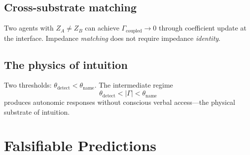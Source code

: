 \documentclass[aps,pre,twocolumn,superscriptaddress,floatfix]{revtex4-2}
\begin{document}
\subsection{Cross-substrate matching}
\label{sec:cross-substrate}

\begin{corollary}
\label{cor:cross-substrate}
Two agents with $Z_A \neq Z_B$ can achieve
$\Gamma_{\text{coupled}}\to 0$ through coefficient update
at the interface.
Impedance \emph{matching} does not require impedance
\emph{identity}.
\end{corollary}

\subsection{The physics of intuition}
\label{sec:intuition}

Two thresholds:
$\theta_{\text{detect}} < \theta_{\text{name}}$.
The intermediate regime
\begin{equation}
  \theta_{\text{detect}} < |\Gamma| < \theta_{\text{name}}
  \label{eq:intuition-band}
\end{equation}
produces autonomic responses without conscious verbal
access---the physical substrate of intuition.


\section{Falsifiable Predictions}
\label{sec:predictions}
\end{document}
